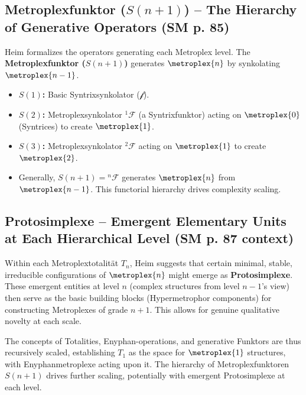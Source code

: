 \documentclass[
    12pt,              %
    a4paper,           %
    headings=normal,   %
    twoside=true,      %
    BCOR=8mm,          %
]{scrbook}
\newcommand{\synkolator}{\mathcal{f}}
\newcommand{\hypersyntrix}{\metroplex{1}}
\newcommand{\metroplexsynkolator}[1]{{}^{#1}\mathcal{F}}
\newcommand{\metroplextotalitaet}[1]{T_{#1}}
\newcommand{\metroplexfunktor}{S}
\begin{document}
\subsection{Metroplexfunktor (\(\metroplexfunktor(n+1)\)) – The Hierarchy of Generative Operators (SM p. 85)}
\label{sec:ch5_metroplexfunktor_hierarchy}
Heim formalizes the operators generating each Metroplex level. The \textbf{Metroplexfunktor (\(\metroplexfunktor(n+1)\))} generates \(\metroplex{n}\) by synkolating \(\metroplex{n-1}\).
\begin{itemize}
    \item   \textbf{\(\metroplexfunktor(1)\):} Basic Syntrixsynkolator (\(\synkolator\)).
    \item   \textbf{\(\metroplexfunktor(2)\):} Metroplexsynkolator \(\metroplexsynkolator{1}\) (a Syntrixfunktor) acting on \(\metroplex{0}\) (Syntrices) to create \(\hypersyntrix\).
    \item   \textbf{\(\metroplexfunktor(3)\):} Metroplexsynkolator \(\metroplexsynkolator{2}\) acting on \(\hypersyntrix\) to create \(\metroplex{2}\).
    \item   Generally, \(\metroplexfunktor(n+1) = \metroplexsynkolator{n}\) generates \(\metroplex{n}\) from \(\metroplex{n-1}\). This functorial hierarchy drives complexity scaling.
\end{itemize}

\subsection{Protosimplexe – Emergent Elementary Units at Each Hierarchical Level (SM p. 87 context)}
\label{sec:ch5_protosimplexe}
Within each Metroplextotalität \(\metroplextotalitaet{n}\), Heim suggests that certain minimal, stable, irreducible configurations of \(\metroplex{n}\) might emerge as \textbf{Protosimplexe}. These emergent entities at level \(n\) (complex structures from level \(n-1\)'s view) then serve as the basic building blocks (Hypermetrophor components) for constructing Metroplexes of grade \(n+1\). This allows for genuine qualitative novelty at each scale.

The concepts of Totalities, Enyphan-operations, and generative Funktors are thus recursively scaled, establishing \(\metroplextotalitaet{1}\) as the space for \(\hypersyntrix\) structures, with Enyphanmetroplexe acting upon it. The hierarchy of Metroplexfunktoren \(\metroplexfunktor(n+1)\) drives further scaling, potentially with emergent Protosimplexe at each level.
\end{document}
